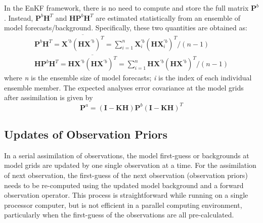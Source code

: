 In the EnKF framework, there is no need to compute and store the full matrix  $\pmb{P}^{b}$. Instead, $\pmb{P}^{b} \pmb{H}^{T} $ and  $\pmb{H} \pmb{P}^{b} \pmb{H}^{T} $ are estimated statistically from an ensemble of model forecasts/background. Specifically, these two quantities are obtained as:
\begin{eqnarray}
\pmb{P}^b \pmb{H}^T = \overline{  \pmb{X}^{\prime b} ( \pmb{HX}^{\prime b} )^T } = \sum_{i=1}^n \pmb{X}^{\prime b}_{i} ( \pmb{HX}_{i}^{\prime b})^T /(n-1)  \label{ch6_eqn_phxhxxhx} \\
\pmb{H} \pmb{P}^b \pmb{H}^T = \overline{ \pmb{HX}^{\prime b} ( \pmb{HX}^{\prime b} )^{T} } = \sum_{i=1}^n \pmb{HX}^{\prime b} ( \pmb{HX}^{\prime b} )^T / (n-1)
\end{eqnarray}
where \textit{n} is the ensemble size of model forecasts; \textit{i} is the index of each individual ensemble member.
The expected analyses error covariance at the model grids after assimilation is given by
\begin{equation}
\pmb{P}^a = (\pmb{I} - \pmb{KH}) \pmb{P}^b(\pmb{I} - \pmb{KH})^T
\end{equation}

   \subsection{Updates of Observation Priors}

In a serial assimilation of observations, the model first-guess or backgrounds at model grids are updated by one single observation at a time. For the assimilation of next observation, the first-guess of the next observation (observation priors) needs to be re-computed using the updated model background and a forward observation operator. This process is straightforward while running on a single processor computer, but is not efficient in a parallel computing environment, particularly when the first-guess of the observations are all pre-calculated.

